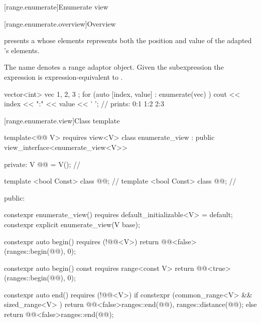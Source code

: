 \documentclass{wg21}
\begin{document}
\begin{addedblock}



[range.enumerate]{Enumerate view}

[range.enumerate.overview]{Overview}

\pnum
{} presents a  whose elements represents both the position and value of the adapted 's elements.

\pnum
The name  denotes a
range adaptor object.
Given the subexpression 
the expression  is expression-equivalent to .

\pnum
\begin{example}
\begin{codeblock}
vector<int> vec{ 1, 2, 3 };
for (auto [index, value] : enumerate(vec) )
    cout << index << ":" << value << ' '; // prints: 0:1 1:2 2:3
\end{codeblock}
\end{example}


[range.enumerate.view]{Class template }


\begin{codeblock}
    template<@@ V>
    requires view<V>
    class enumerate_view : public view_interface<enumerate_view<V>> {

      private:
        V @@ = V(); // \expos

        template <bool Const>
        class @@; // \expos
        template <bool Const>
        class @@; // \expos

       public:

        constexpr enumerate_view() requires default_­initializable<V> = default;
        constexpr explicit enumerate_view(V base);

        constexpr auto begin() requires (!@@<V>)
        { return @@<false>(ranges::begin(@@), 0); }

        constexpr auto begin() const requires range<const V>
        { return @@<true>(ranges::begin(@@), 0); }

        constexpr auto end() requires (!@@<V>) {
        	if constexpr (common_­range<V>  && sized_range<V> ) {
        		return @@<false>{ranges::end(@@), ranges::distance(@@)};
        	} else {
        		return @@<false>{ranges::end(@@)};
        	}
        }

}
\end{codeblock}
\end{addedblock}
\end{document}
